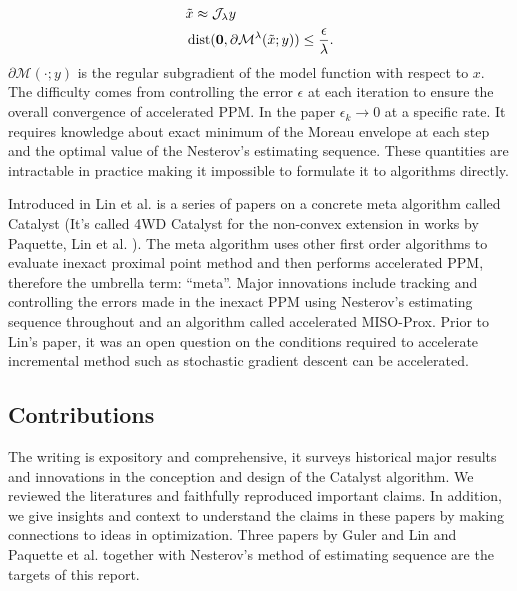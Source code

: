 \documentclass[12pt]{article}
\begin{document}
    \begin{align*}
        & \tilde x \approx \mathcal J_\lambda y
        \\
        & 
        \operatorname{dist}(\mathbf 0, \partial\mathcal{M}^{\lambda}(\tilde x; y))
        \le \frac{\epsilon}{\lambda}. 
    \end{align*}
    $\partial \mathcal M(\cdot; y)$ is the regular subgradient of the model function with respect  to $x$. 
    The difficulty comes from controlling the error $\epsilon$ at each iteration to ensure the overall convergence of accelerated PPM. 
    In the paper $\epsilon_k \rightarrow 0$ at a specific rate. 
    It requires knowledge about exact minimum of the Moreau envelope at each step and the optimal value of the Nesterov's estimating sequence. 
    These quantities are intractable in practice making it impossible to formulate it to algorithms directly. 
    \par
    Introduced in Lin et al. \cite{lin_universal_2015,lin_catalyst_2018} is a series of papers on a concrete meta algorithm called Catalyst (It's called 4WD Catalyst for the non-convex extension in works by Paquette, Lin et al. \cite{paquette_catalyst_2018}). 
    The meta algorithm uses other first order algorithms to evaluate inexact proximal point method and then performs accelerated PPM, therefore the umbrella term: ``meta''. 
    Major innovations include tracking and controlling the errors made in the inexact PPM using Nesterov's estimating sequence throughout and an algorithm called accelerated MISO-Prox.  
    Prior to Lin's paper, it was an open question on the conditions required to accelerate incremental method such as stochastic gradient descent can be accelerated. 

    \subsection{Contributions}
        The writing is expository and comprehensive, it surveys historical major results and innovations in the conception and design of the Catalyst algorithm. 
        We reviewed the literatures and faithfully reproduced important claims.
        In addition, we give insights and context to understand the claims in these papers by making connections to ideas in optimization. 
        Three papers by Guler \cite{guler_new_1992} and Lin \cite{lin_universal_2015} and Paquette et al. \cite{lin_catalyst_2018} together with Nesterov's \cite{nesterov_lectures_2018} method of estimating sequence are the targets of this report. 
\end{document}

